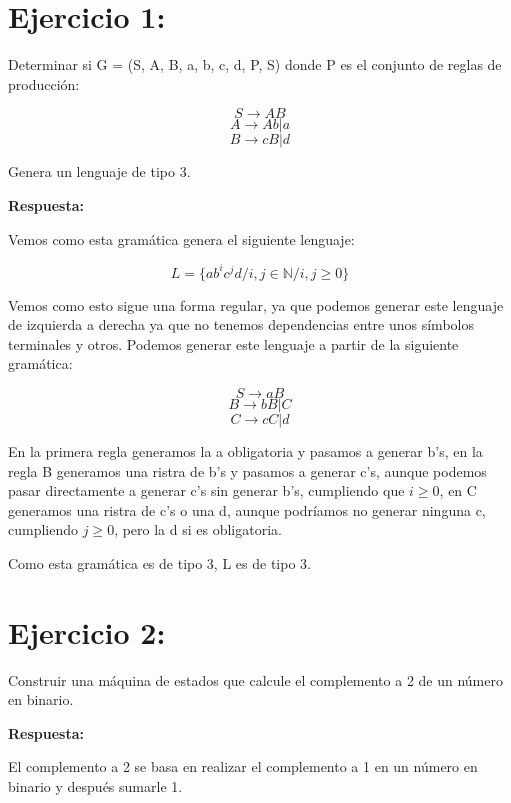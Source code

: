 \documentclass[12pt, spanish]{article}
\begin{document}



\section{Ejercicio 1:} 

Determinar si G = ({S, A, B}, {a, b, c, d}, P, S) donde P es el conjunto de reglas de producción:

$$ S \rightarrow AB $$
$$ A \rightarrow Ab | a $$
$$ B \rightarrow cB | d $$

Genera un lenguaje de tipo 3.

\textbf{Respuesta:}

Vemos como esta gramática genera el siguiente lenguaje:

$$ L = \{ab^ic^jd / i, j \in \mathbb{N} / i, j \geq 0\} $$

Vemos como esto sigue una forma regular, ya que podemos generar este lenguaje de izquierda a derecha ya que no tenemos dependencias entre unos símbolos terminales y otros. Podemos generar este lenguaje a partir de la siguiente gramática:

$$ S \rightarrow aB $$
$$ B \rightarrow bB | C $$
$$ C \rightarrow cC | d $$

En la primera regla generamos la a obligatoria y pasamos a generar b's, en la regla B generamos una ristra de b's y pasamos a generar c's, aunque podemos pasar directamente a generar c's sin generar b's, cumpliendo que $i \geq 0$, en C generamos una ristra de c's o una d, aunque podríamos no generar ninguna c, cumpliendo $j \geq 0$, pero la d si es obligatoria.

Como esta gramática es de tipo 3, L es de tipo 3.

\newpage

\section{Ejercicio 2:}

Construir una máquina de estados que calcule el complemento a 2 de un número en binario.

\textbf{Respuesta:}

El complemento a 2 se basa en realizar el complemento a 1 en un número en binario y después sumarle 1.
\end{document}
